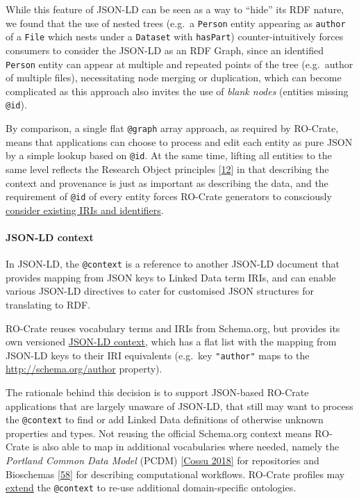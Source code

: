 While this feature of JSON-LD can be seen as a way to ``hide'' its RDF
nature, we found that the use of nested trees (e.g.~a \texttt{Person}
entity appearing as \texttt{author} of a \texttt{File} which nests under
a \texttt{Dataset} with \texttt{hasPart}) counter-intuitively forces
consumers to consider the JSON-LD as an RDF Graph, since an identified
\texttt{Person} entity can appear at multiple and repeated points of the
tree (e.g.~author of multiple files), necessitating node merging or
duplication, which can become complicated as this approach also invites
the use of \emph{blank nodes} (entities missing \texttt{@id}).

By comparison, a single flat \texttt{@graph} array approach, as required
by RO-Crate, means that applications can choose to process and edit each
entity as pure JSON by a simple lookup based on \texttt{@id}. At the
same time, lifting all entities to the same level reflects the Research
Object principles
{[}\href{https://www.research.manchester.ac.uk/portal/en/publications/why-linked-data-is-not-enough-for-scientists(479e591e-b295-4478-b0c7-a145c19dcd45).html}{12}{]}
in that describing the context and provenance is just as important as
describing the data, and the requirement of \texttt{@id} of every entity
forces RO-Crate generators to consciously
\href{https://www.researchobject.org/ro-crate/1.1/appendix/jsonld.html\#describing-entities-in-json-ld}{consider
existing IRIs and identifiers}.

\hypertarget{json-ld-context}{%
\paragraph{JSON-LD context}\label{json-ld-context}}

In JSON-LD, the \texttt{@context} is a reference to another JSON-LD
document that provides mapping from JSON keys to Linked Data term IRIs,
and can enable various JSON-LD directives to cater for customised JSON
structures for translating to RDF.

RO-Crate reuses vocabulary terms and IRIs from Schema.org, but provides
its own versioned \href{https://w3id.org/ro/crate/1.1/context}{JSON-LD
context}, which has a flat list with the mapping from JSON-LD keys to
their IRI equivalents (e.g.~key \texttt{"author"} maps to the
\url{http://schema.org/author} property).

The rationale behind this decision is to support JSON-based RO-Crate
applications that are largely unaware of JSON-LD, that still may want to
process the \texttt{@context} to find or add Linked Data definitions of
otherwise unknown properties and types. Not reusing the official
Schema.org context means RO-Crate is also able to map in additional
vocabularies where needed, namely the \emph{Portland Common Data Model}
(PCDM) \href{https://github.com/duraspace/pcdm/wiki}{{[}Cossu 2018{]}} for
repositories and Bioschemas
\href{https://iswc2017.semanticweb.org/paper-579/}{{[}58{]}} for
describing computational workflows. RO-Crate profiles may
\href{https://www.researchobject.org/ro-crate/1.1/appendix/jsonld.html\#extending-ro-crate}{extend}
the \texttt{@context} to re-use additional domain-specific ontologies.

